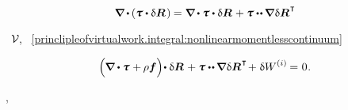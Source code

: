 \nopagebreak\vspace{-0.1em}\begin{equation*}
\boldnabla \hspace{-0.1ex} \dotp \hspace{-0.1ex} \left( \cauchystress \dotp \variation{\bm{R}} \hspace{.2ex} \right) \hspace{-0.1ex}
= \boldnabla \hspace{-0.1ex} \dotp \cauchystress \dotp \variation{\bm{R}} \hspace{.15ex}
+ \cauchystress \dotdotp \hspace{-0.12ex} \boldnabla \hspace{.1ex} \variation{\bm{R}}^{\hspace{.1ex}\T}
\end{equation*}

\vspace{-0.1em} \noindent {}~${\mathcal{V}\hspace{-0.2ex}}$, ~\eqref{princlipleofvirtualwork.integral:nonlinearmomentlesscontinuum}

\nopagebreak\vspace{-0.2em}\begin{equation}\label{princlipleofvirtualwork.local:nonlinearmomentlesscontinuum}
\left(^{\mathstrut} \hspace{-0.2ex} \boldnabla \dotp \cauchystress \hspace{.1ex} + \hspace{-0.1ex} \rho \bm{f} \right) \hspace{-0.4ex} \dotp \variation{\bm{R}} \hspace{.2ex}
+ \cauchystress \dotdotp \hspace{-0.12ex} \boldnabla \hspace{.1ex} \variation{\bm{R}}^{\hspace{.1ex}\T} \hspace{-0.32ex}
+ \hspace{.1ex} \variation{\internalwork}
= \hspace{.1ex} 0 \hspace{.1ex}.
\end{equation}

\vspace{-0.25em}
   , 

